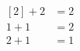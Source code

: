 \documentclass[preview]{standalone}
\begin{document}
\begin{align*}
\begin{aligned}[2] + 2 &= 2 \\1 + 1 &= 2 \\2 + 1 &= 1\end{aligned}
\end{align*}
\end{document}

